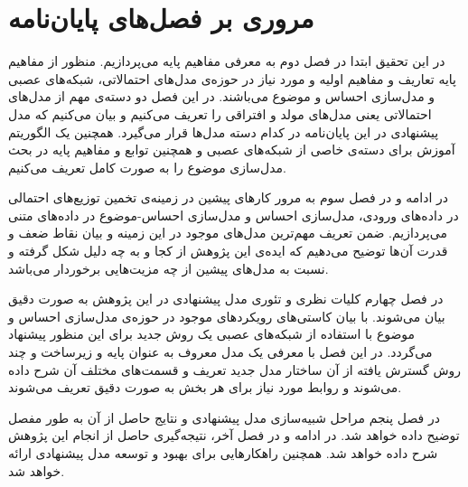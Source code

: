 \section{مروری بر فصل‌های پایان‌نامه}
در این تحقیق ابتدا در فصل دوم به معرفی‌ مفاهیم پایه می‌‌پردازیم. منظور از مفاهیم پایه ‌تعاریف و مفاهیم اولیه‌ و مورد نیاز در حوزه‌ی مدل‌های احتمالاتی، شبکه‌های عصبی و مدل‌سازی احساس و موضوع می‌‌باشند. در این فصل دو دسته‌ی مهم از مدل‌های احتمالاتی یعنی‌ مدل‌های مولد و افتراقی را تعریف می‌‌کنیم و بیان می‌کنیم که مدل پیشنهادی در این پایان‌‌نامه در کدام دسته‌ مدل‌ها قرار می‌گیرد. همچنین یک الگوریتم آموزش برای دسته‌ی خاصی‌ از شبکه‌های عصبی و همچنین توابع و مفاهیم پایه در بحث مدل‌سازی موضوع را به صورت کامل تعریف می‌کنیم.

در ادامه و در فصل سوم به مرور کارهای پیشین در زمینه‌ی تخمین توزیع‌های احتمالی‌ در داده‌های ورودی، مدل‌سازی احساس و مدل‌سازی احساس‌-موضوع در داده‌های متنی می‌‌پردازیم. ضمن تعریف مهم‌ترین مدل‌های موجود در این زمینه و بیان نقاط ضعف و قدرت آن‌ها توضیح می‌‌دهیم که ایده‌ی این پژوهش از کجا و به چه دلیل شکل گرفته و نسبت به مدل‌های پیشین از چه مزیت‌هایی برخوردار می‌‌باشد.

در فصل چهارم کلیات نظری و تئوری مدل پیشنهادی در این پژوهش به صورت دقیق بیان می‌‌شوند. با بیان کاستی‌های رویکردهای موجود در حوزه‌ی مدل‌سازی احساس و موضوع با استفاده از شبکه‌های عصبی یک روش جدید برای این منظور پیشنهاد می‌‌گردد. در این فصل با معرفی‌ یک مدل معروف به عنوان پایه و زیرساخت و چند روش گسترش یافته از آن ساختار مدل جدید تعریف و قسمت‌های مختلف آن شرح داده می‌‌شوند و روابط مورد نیاز برای هر بخش به صورت دقیق تعریف می‌‌شوند.

 در فصل پنجم مراحل شبیه‌سازی مدل پیشنهادی و نتایج حاصل از آن به طور مفصل توضیح داده خواهد شد.
 در ادامه و در فصل آخر، نتیجه‌گیری حاصل از انجام این پژوهش شرح داده خواهد شد. همچنین راهکارهایی برای بهبود و توسعه مدل پیشنهادی ارائه خواهد شد.
\thispagestyle{empty} 













